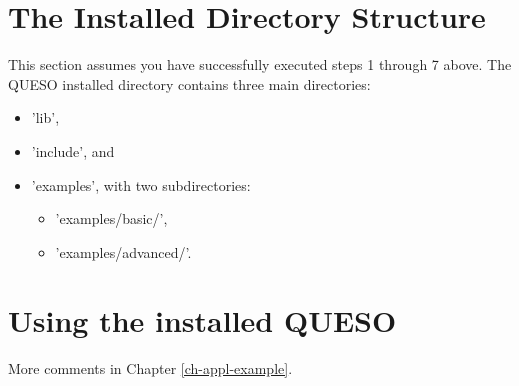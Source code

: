 \section{The Installed Directory Structure} \label{sc-installed-dir-structure}

This section assumes you have successfully executed steps 1 through 7 above.
The QUESO installed directory contains three main directories:
\begin{itemize}
\item 'lib',
\item 'include', and
\item {'examples', with two subdirectories:
\begin{itemize}
\item 'examples/basic/',
\item 'examples/advanced/'.
\end{itemize}
}
\end{itemize}

\section{Using the installed QUESO} \label{sc-using-queso}

More comments in Chapter \ref{ch-appl-example}.
